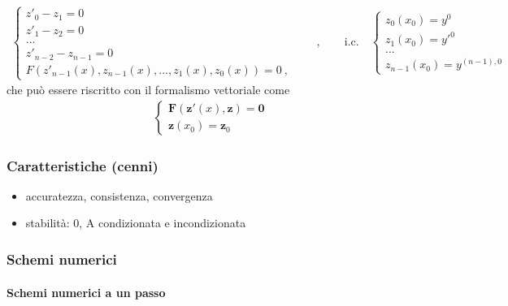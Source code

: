 \documentclass[letterpaper,10pt,english]{jupyterBook}
\begin{document}
\begin{equation*}
\begin{split}\begin{cases}
z'_0 - z_1 = 0 \\
z'_1 - z_2 = 0 \\
\dots \\
z'_{n-2} - z_{n-1} = 0 \\
F(z'_{n-1}(x), z_{n-1}(x), \dots, z_1(x), z_0(x)) = 0 \ ,
\end{cases}
\qquad , \qquad
\text{i.c.} \quad
\begin{cases}
z_0(x_0) = y^0 \\
z_1(x_0) = y'^0 \\
\dots \\
z_{n-1}(x_0) = y^{(n-1),0}
\end{cases}
\end{split}
\end{equation*}
\sphinxAtStartPar
che può essere riscritto con il formalismo vettoriale come
\begin{equation*}
\begin{split}\begin{cases}
  \mathbf{F}(\mathbf{z}'(x), \mathbf{z}) = \mathbf{0} \\
  \mathbf{z}(x_0) = \mathbf{z}_0
\end{cases}\end{split}
\end{equation*}

\subsubsection{Caratteristiche (cenni)}
\label{\detokenize{ch/numerics/ode-cauchy:caratteristiche-cenni}}\begin{itemize}
\item {} 
\sphinxAtStartPar
accuratezza, consistenza, convergenza

\item {} 
\sphinxAtStartPar
stabilità: 0\sphinxhyphen{}, A\sphinxhyphen{} condizionata e incondizionata

\end{itemize}


\subsubsection{Schemi numerici}
\label{\detokenize{ch/numerics/ode-cauchy:schemi-numerici}}

\paragraph{Schemi numerici a un passo}
\label{\detokenize{ch/numerics/ode-cauchy:schemi-numerici-a-un-passo}}
\end{document}
